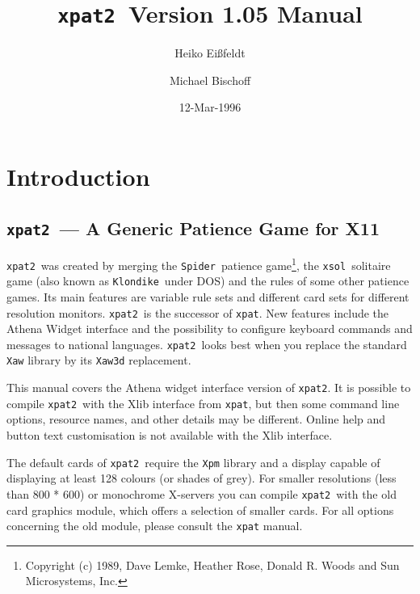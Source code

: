 \newcommand{\xpat}{{\tt xpat2}}
\newcommand{\xsol}{{\tt xsol}}
\newcommand{\freecell}{{\tt FreeCell}}
\newcommand{\klondike}{{\tt Klondike}}
\newcommand{\spider}{{\tt Spider}}
\newcommand{\gypsy}{{\tt Gypsy}}
\newcommand{\seahaven}{{\tt Seahaven Towers}}
\title{\xpat\ Version 1.05 Manual}
\author{Heiko Ei\ss{}feldt \and Michael Bischoff}
\date{12-Mar-1996}

\maketitle
\tableofcontents

\newpage
\section{Introduction}
\subsection{\xpat\ --- A Generic Patience Game for X11}
\xpat\ was created by merging the \spider\ patience game\footnote{Copyright (c)
  1989, Dave Lemke, Heather Rose, Donald R. Woods and Sun Microsystems, Inc.},
the \xsol\ solitaire game (also known as \klondike\ under DOS) and the rules of
some other patience games.  Its main features are variable rule sets and
different card sets for different resolution monitors.
\xpat\ is the successor of {\tt xpat}. New features include the Athena Widget
interface and the possibility to configure keyboard commands and messages to
national languages. \xpat\ looks best when you replace the standard {\tt Xaw}
library by its {\tt Xaw3d} replacement.


This manual covers the Athena widget interface version of \xpat. It is possible
to compile \xpat\ with the Xlib interface from {\tt xpat}, but then some
command line options, resource names,  and other details may be different. 
Online help and button text customisation is not available with the Xlib
interface. %

The default cards of \xpat\ require the {\tt Xpm} library and a display
capable of displaying at least 128 colours (or shades of grey).
For smaller resolutions (less than 800 * 600) or monochrome X-servers
you can compile \xpat\ with the old card graphics module, which offers
a selection of smaller cards. For all options concerning the old module,
please consult the {\tt xpat} manual.


